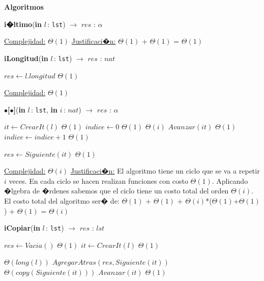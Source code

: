 \documentclass[a4paper,10pt]{article}
\let\TipoVariable=\texttt
\let\ModificadorArgumento=\textbf
\newcommand{\In}[2]{\ModificadorArgumento{in} \ensuremath{#1}\,: \TipoVariable{#2}\xspace}
\newenvironment{Algoritmos}{%
  \vspace*{2ex}%
  \noindent\textbf{\Large Algoritmos}%
  \vspace*{2ex}%
}{}
\begin{document}
\begin{Algoritmos}
\begin{algorithm}[H]{\textbf{i�ltimo}(\In{l}{lst}) $\to$ $res$ : $\alpha$}
\begin{algorithmic}[1]
			\medskip
			\Statex \underline{Complejidad:} $\Theta(1)$
			\Statex \underline{Justificaci�n:} $\Theta(1)$ + $\Theta(1)$ = $\Theta(1)$
    	\end{algorithmic}
\end{algorithm}	
	
\begin{algorithm}[H]{\textbf{iLongitud}(\In{l}{lst}) $\to$ $res$ : $nat$}	
	\begin{algorithmic}[1]
			 \State $res \gets l.longitud$	\Comment $\Theta(1)$ 
    	
		\medskip
		\Statex \underline{Complejidad:}  $\Theta(1)$
    \end{algorithmic}
\end{algorithm}	
	
\begin{algorithm}[H]{\textbf{$\bullet$[$\bullet$]}(\In{l}{lst}, \In{i}{$nat$}) $\to$ $res$ : $\alpha$}	
	\begin{algorithmic}[1]
			 \State $it \gets CrearIt(l)$		\Comment $\Theta(1)$
			 \State $indice \gets 0$		\Comment $\Theta(1)$
			 			\Comment $\Theta(i)$
			 	\State $Avanzar(it)$		\Comment $\Theta(1)$
				\State $indice \gets indice + 1$		\Comment $\Theta(1)$
			 \EndWhile
			 
			 \State $res \gets Siguiente(it)$		\Comment $\Theta(1)$
    	
		\medskip
		\Statex \underline{Complejidad:} $\Theta(i)$
		\Statex \underline{Justificaci�n:} El algoritmo tiene un ciclo que se va a repetir $i$ veces. En cada ciclo se hacen realizan funciones con costo $\Theta(1)$. Aplicando �lgebra de �rdenes sabemos que el ciclo tiene un costo total del orden $\Theta(i)$. El costo total del algoritmo ser� de:  $\Theta(1)$ + $\Theta(1)$ + $\Theta(i)$*($\Theta(1)$+$\Theta(1)$) + $\Theta(1)$ = $\Theta(i)$
    \end{algorithmic}
\end{algorithm}	


\begin{algorithm}[H]{\textbf{iCopiar}(\In{l}{lst}) $\to$ $res$ : $lst$}	
	\begin{algorithmic}[1]
			\State $res \gets Vacia()$	\Comment $\Theta(1)$
			\State $it \gets CrearIt(l)$	\Comment $\Theta(1)$
			
			 	\Comment $\Theta(long(l))$
			 	\State $AgregarAtras(res, Siguiente(it))$	\Comment $\Theta(copy(Siguiente(it)))$
				\State $Avanzar(it)$	\Comment $\Theta(1)$
			\EndWhile
    	

\end{algorithmic}
\end{algorithm}
\end{Algoritmos}
\end{document}

